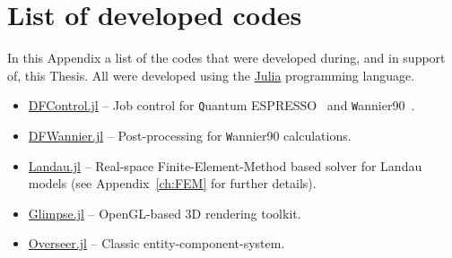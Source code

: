 \chapter{List of developed codes}
In this Appendix a list of the codes that were developed during, and in support of, this Thesis. All were developed using the \href{https://julialang.org}{Julia} programming language.
\begin{itemize}
	\item \href{https://github.com/louisponet/DFControl.jl}{DFControl.jl} -- Job control for {\texttt Quantum ESPRESSO}~\cite{Giannozzi2009} and {\texttt Wannier90}~\cite{Mostofi2014AnFunctions}.
	\item \href{https://github.com/louisponet/DFWannier.jl}{DFWannier.jl} -- Post-processing for {\texttt Wannier90} calculations.
	\item \href{https://github.com/louisponet/Landau.jl}{Landau.jl} -- Real-space Finite-Element-Method based solver for Landau models (see Appendix~\ref{ch:FEM} for further details).
	\item \href{https://github.com/louisponet/Glimpse.jl}{Glimpse.jl} -- OpenGL-based 3D rendering toolkit.
	\item \href{https://github.com/louisponet/Overseer.jl}{Overseer.jl} -- Classic entity-component-system.
\end{itemize}

